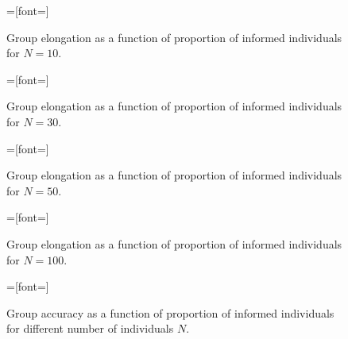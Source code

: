 
\setlength{}
\setlength{}

\begin{figure}[H]
{}=[font=\scriptsize]

\caption{Group elongation as a function of proportion of informed individuals for $N=10$.}
\label{fig:elong10}
\end{figure}

\begin{figure}[H]
{}=[font=\scriptsize]

\caption{Group elongation as a function of proportion of informed individuals for $N=30$.}
\label{fig:elong30}
\end{figure}

\begin{figure}[H]
{}=[font=\scriptsize]

\caption{Group elongation as a function of proportion of informed individuals for $N=50$.}
\label{fig:elong50}
\end{figure}

\begin{figure}[H]
{}=[font=\scriptsize]

\caption{Group elongation as a function of proportion of informed individuals for $N=100$.}
\label{fig:elong100}
\end{figure}
\vfill

\begin{figure}[H]
{}=[font=\scriptsize]

\caption{Group accuracy as a function of proportion of informed individuals for different number of individuals $N$.}
\label{fig:elong100}
\end{figure}